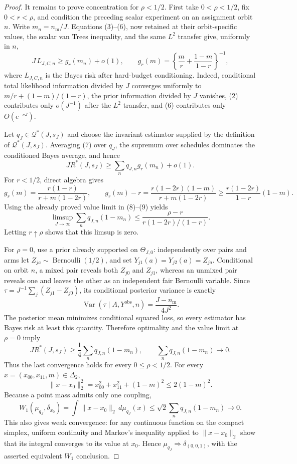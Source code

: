 \documentclass{article}
\begin{document}
\begin{proof}
It remains to prove concentration for \(\rho<1/2\).  First take \(0<\rho<1/2\), fix \(0<r<\rho\), and condition the preceding scalar experiment on an assignment orbit \(n\).  Write \(m_n=n_{\mathrm m}/J\).  Equations (3)--(6), now retained at their orbit-specific values, the scalar van Trees inequality, and the same \(L^2\) transfer give, uniformly in \(n\),
\[
 J\,L_{J,C,n}\ge g_r(m_n)+o(1),
 \qquad
 g_r(m)=\left\{\frac m r+\frac{1-m}{1-r}\right\}^{-1},
 \tag{7}
\]
where \(L_{J,C,n}\) is the Bayes risk after hard-budget conditioning.  Indeed, conditional total likelihood information divided by \(J\) converges uniformly to \(m/r+(1-m)/(1-r)\), the prior information divided by \(J\) vanishes, (2) contributes only \(o(J^{-1})\) after the \(L^2\) transfer, and (6) contributes only \(O(e^{-cJ})\).

Let \(q_J\in\mathcal Q^*(J,s_J)\) and choose the invariant estimator supplied by the definition of \(\mathcal Q^*(J,s_J)\).  Averaging (7) over \(q_J\), the supremum over schedules dominates the conditioned Bayes average, and hence
\[
 J R^*(J,s_J)
 \ge \sum_nq_{J,n}g_r(m_n)+o(1).
 \tag{8}
\]
For \(r<1/2\), direct algebra gives
\[
 g_r(m)
 =\frac{r(1-r)}{r+m(1-2r)},
 \qquad
 g_r(m)-r
 =\frac{r(1-2r)(1-m)}{r+m(1-2r)}
 \ge \frac{r(1-2r)}{1-r}(1-m).
 \tag{9}
\]
Using the already proved value limit in (8)--(9) yields
\[
 \limsup_{J\to\infty}
 \sum_nq_{J,n}(1-m_n)
 \le
 \frac{\rho-r}{r(1-2r)/(1-r)}.
\]
Letting \(r\uparrow\rho\) shows that this limsup is zero.

For \(\rho=0\), use a prior already supported on \(\Theta_{J,0}\): independently over pairs and arms let \(Z_{ja}\sim\operatorname{Bernoulli}(1/2)\), and set \(Y_{j1}(a)=Y_{j2}(a)=Z_{ja}\).  Conditional on orbit \(n\), a mixed pair reveals both \(Z_{j0}\) and \(Z_{j1}\), whereas an unmixed pair reveals one and leaves the other as an independent fair Bernoulli variable.  Since
\(
 \tau=J^{-1}\sum_j(Z_{j1}-Z_{j0})
\), its conditional posterior variance is exactly
\[
 \operatorname{Var}(\tau\mid A,Y^{\mathrm{obs}},n)
 =\frac{J-n_{\mathrm m}}{4J^2}.
\]
The posterior mean minimizes conditional squared loss, so every estimator has Bayes risk at least this quantity.  Therefore optimality and the value limit at \(\rho=0\) imply
\[
 J R^*(J,s_J)
 \ge\frac14\sum_nq_{J,n}(1-m_n),
 \qquad
 \sum_nq_{J,n}(1-m_n)\longrightarrow0.
 \tag{10}
\]
Thus the last convergence holds for every \(0\le\rho<1/2\).  For every \(x=(x_{00},x_{11},m)\in\Delta_2\),
\[
 \|x-x_0\|_2^2=x_{00}^2+x_{11}^2+(1-m)^2
 \le2(1-m)^2.
\]
Because a point mass admits only one coupling,
\[
 W_1(\mu_{q_J},\delta_{x_0})
 =\int\|x-x_0\|_2\,d\mu_{q_J}(x)
 \le\sqrt2\sum_nq_{J,n}(1-m_n)\longrightarrow0.
\]
This also gives weak convergence: for any continuous function on the compact simplex, uniform continuity and Markov's inequality applied to \(\|x-x_0\|_2\) show that its integral converges to its value at \(x_0\).  Hence \(\mu_{q_J}\Rightarrow\delta_{(0,0,1)}\), with the asserted equivalent \(W_1\) conclusion.
\end{proof}
\end{document}
